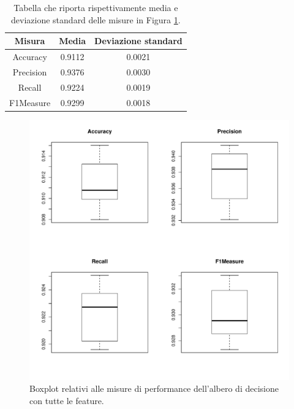 \begin{table}
	\caption{Tabella che riporta rispettivamente media e deviazione standard delle misure in Figura \ref{fig:treeperformance}.}
	\label{tab:treeperformance}
	\centering
	\begin{tabular}{c|cc}
		Misura & Media & Deviazione standard \\
		\hline
		Accuracy & 0.9112 & 0.0021 \\ 
		Precision & 0.9376 & 0.0030 \\
		Recall & 0.9224 & 0.0019 \\
		F1Measure & 0.9299 & 0.0018 \\
	\end{tabular}
\end{table}
\begin{figure}
	\centering
	\includegraphics[width=0.7\linewidth]{../FinalResults/Tree_performance}
	\caption{Boxplot relativi alle misure di performance dell'albero di decisione con tutte le feature.}
	\label{fig:treeperformance}
\end{figure}
